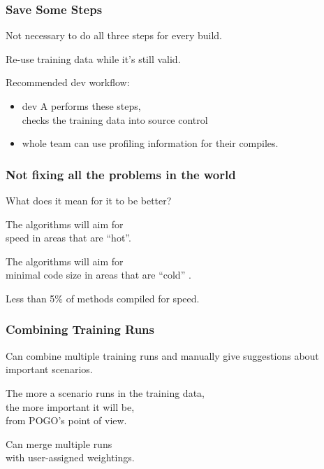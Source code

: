 \begin{frame}
\frametitle{Save Some Steps}

\large
\begin{changemargin}{2cm}
Not necessary to do all three steps for every build. 

Re-use training data while it's still valid.

Recommended dev workflow:
\begin{itemize}
\item dev A performs these steps, \\
checks the training data into source control
\item whole team can use profiling information for their compiles.
\end{itemize}
\end{changemargin}

\end{frame}



\begin{frame}
\frametitle{Not fixing all the problems in the world}

\large
\begin{changemargin}{2cm}
What does it mean for it to be better? 

The algorithms will aim for \\
speed in areas that are ``hot''. 

The algorithms will aim for \\
minimal code size in areas that are ``cold'' .

Less than 5\% of methods compiled for speed.
\end{changemargin}
\end{frame}



\begin{frame}
\frametitle{Combining Training Runs}

\large
\begin{changemargin}{2cm}
Can combine multiple training runs and manually give suggestions about important scenarios.

The more a scenario runs in the training data, \\
the more important it will be, \\
from POGO's point of view.

Can merge multiple runs \\
with user-assigned weightings.
\end{changemargin}

\end{frame}



